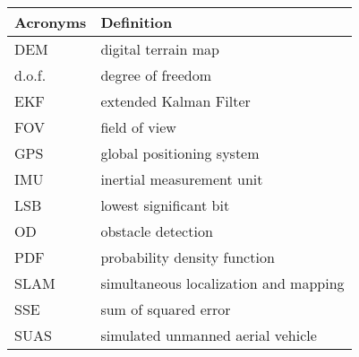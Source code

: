 \begin{center}
\begin{longtable}{ll}
  \hline
  \textbf{Acronyms} & \textbf{Definition} \\
  \hline\hline

DEM     &       digital terrain map\\
d.o.f.  &       degree of freedom \\
EKF     &       extended Kalman Filter \\
FOV	&	field of view	\\
GPS     &       global positioning system \\
IMU     &       inertial measurement unit \\
LSB     &       lowest significant bit  \\
OD      &       obstacle detection \\
PDF     &       probability density function \\
SLAM    &       simultaneous localization and mapping \\
SSE     &       sum of squared error\\
SUAS    &       simulated unmanned aerial vehicle \\

  \hline
\end{longtable}
\end{center}
